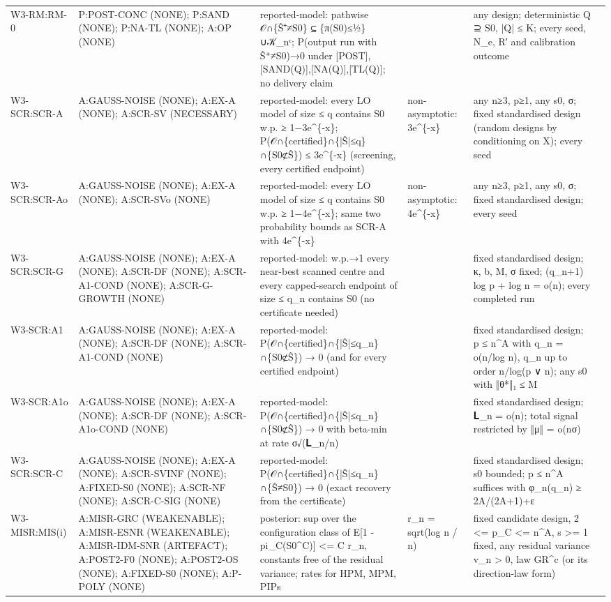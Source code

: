 \begin{longtable}{p{2.2cm}p{4.2cm}p{3cm}p{1.6cm}p{2.6cm}p{1.6cm}}
W3-RM:RM-0 & P:POST-CONC (NONE); P:SAND (NONE); P:NA-TL (NONE); A:OP (NONE) & reported-model: pathwise 𝒪∩\{Ŝ⁺≠S0\} ⊆ \{π(S0)≤½\}∪𝒦\_nᶜ; P(output run with Ŝ⁺≠S0)→0 under [POST],[SAND(Q)],[NA(Q)],[TL(Q)]; no delivery claim &  & any design; deterministic Q ⊇ S0, |Q| ≤ K; every seed, N\_e, R′ and calibration outcome &  \\
W3-SCR:SCR-A & A:GAUSS-NOISE (NONE); A:EX-A (NONE); A:SCR-SV (NECESSARY) & reported-model: every LO model of size ≤ q contains S0 w.p. ≥ 1−3e\^{}\{-x\}; P(𝒪∩\{certified\}∩\{|Ŝ|≤q\}∩\{S0⊄Ŝ\}) ≤ 3e\^{}\{-x\} (screening, every certified endpoint) & non-asymptotic: 3e\^{}\{-x\} & any n≥3, p≥1, any s0, σ; fixed standardised design (random designs by conditioning on X); every seed &  \\
W3-SCR:SCR-Ao & A:GAUSS-NOISE (NONE); A:EX-A (NONE); A:SCR-SVo (NONE) & reported-model: every LO model of size ≤ q contains S0 w.p. ≥ 1−4e\^{}\{-x\}; same two probability bounds as SCR-A with 4e\^{}\{-x\} & non-asymptotic: 4e\^{}\{-x\} & any n≥3, p≥1, any s0, σ; fixed standardised design; every seed &  \\
W3-SCR:SCR-G & A:GAUSS-NOISE (NONE); A:EX-A (NONE); A:SCR-DF (NONE); A:SCR-A1-COND (NONE); A:SCR-G-GROWTH (NONE) & reported-model: w.p.→1 every near-best scanned centre and every capped-search endpoint of size ≤ q\_n contains S0 (no certificate needed) &  & fixed standardised design; κ, b, M, σ fixed; (q\_n+1) log p + log n = o(n); every completed run &  \\
W3-SCR:A1 & A:GAUSS-NOISE (NONE); A:EX-A (NONE); A:SCR-DF (NONE); A:SCR-A1-COND (NONE) & reported-model: P(𝒪∩\{certified\}∩\{|Ŝ|≤q\_n\}∩\{S0⊄Ŝ\}) → 0 (and for every certified endpoint) &  & fixed standardised design; p ≤ n\^{}A with q\_n = o(n/log n), q\_n up to order n/log(p ∨ n); any s0 with ‖θ*‖₁ ≤ M &  \\
W3-SCR:A1o & A:GAUSS-NOISE (NONE); A:EX-A (NONE); A:SCR-DF (NONE); A:SCR-A1o-COND (NONE) & reported-model: P(𝒪∩\{certified\}∩\{|Ŝ|≤q\_n\}∩\{S0⊄Ŝ\}) → 0 with beta-min at rate σ√(𝐋\_n/n) &  & fixed standardised design; 𝐋\_n = o(n); total signal restricted by ‖μ‖ = o(nσ) &  \\
W3-SCR:SCR-C & A:GAUSS-NOISE (NONE); A:EX-A (NONE); A:SCR-SVINF (NONE); A:FIXED-S0 (NONE); A:SCR-NF (NONE); A:SCR-C-SIG (NONE) & reported-model: P(𝒪∩\{certified\}∩\{|Ŝ|≤q\_n\}∩\{Ŝ≠S0\}) → 0 (exact recovery from the certificate) &  & fixed standardised design; s0 bounded; p ≤ n\^{}A suffices with φ\_n(q\_n) ≥ 2A/(2A+1)+ε &  \\
W3-MISR:MIS(i) & A:MISR-GRC (WEAKENABLE); A:MISR-ESNR (WEAKENABLE); A:MISR-IDM-SNR (ARTEFACT); A:POST2-F0 (NONE); A:POST2-OS (NONE); A:FIXED-S0 (NONE); A:P-POLY (NONE) & posterior: sup over the configuration class of E[1 - pi\_C(S0\^{}C)] <= C r\_n, constants free of the residual variance; rates for HPM, MPM, PIPs & r\_n = sqrt(log n / n) & fixed candidate design, 2 <= p\_C <= n\^{}A, s >= 1 fixed, any residual variance v\_n > 0, law GR\^{}c (or its direction-law form) &  \\

\end{longtable}

